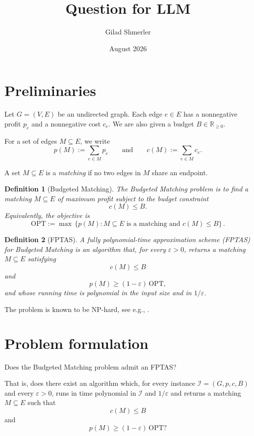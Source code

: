 \documentclass{article}
\title{Question for LLM}
\author{Gilad Shmerler}
\date{August 2026}
\newtheorem{definition}{Definition}[section]
\begin{document}
\maketitle

\section{Preliminaries}

Let $G=(V,E)$ be an undirected graph. Each edge $e\in E$ has a nonnegative profit $p_e$ and a nonnegative
cost $c_e$. We are also given a budget $B\in\mathbb{R}_{\geq 0}$.

For a set of edges $M\subseteq E$, we write
\[
    p(M):=\sum_{e\in M}p_e
    \qquad\text{and}\qquad
    c(M):=\sum_{e\in M}c_e.
\]

A set $M\subseteq E$ is a \emph{matching} if no two edges in $M$ share an endpoint.

\begin{definition}[Budgeted Matching]
The \emph{Budgeted Matching} problem is to find a matching $M\subseteq E$ of maximum profit subject to the budget constraint
\[
    c(M)\leq B.
\]
Equivalently, the objective is
\[
    \mathrm{OPT}:=\max\,\{p(M):M\subseteq E\text{ is a matching and }c(M)\leq B\}\,.
\]
\end{definition}

\begin{definition}[FPTAS]
A \emph{fully polynomial-time approximation scheme (FPTAS)} for Budgeted Matching is an algorithm that, for every
$\varepsilon>0$, returns a matching $M\subseteq E$ satisfying
\[
    c(M)\leq B
\]
and
\[
    p(M)\geq(1-\varepsilon)\,\mathrm{OPT},
\]
and whose running time is polynomial in the input size and in $1/\varepsilon$.
\end{definition}

The problem is known to be NP-hard, see e.g., \cite{doron-arad-shachnai-shmerler-talgam-cohen,doron-arad-kulik-shachnai}.

\section{Problem formulation}

Does the Budgeted Matching problem admit an FPTAS?

That is, does there exist an algorithm which, for every instance $\mathcal{I}=(G,p,c,B)$ and every $\varepsilon>0$, runs in
time polynomial in $\mathcal{I}$ and $1/\varepsilon$ and returns a matching $M\subseteq E$ such that
\[
    c(M)\leq B
\]
and
\[
    p(M)\geq(1-\varepsilon)\,\mathrm{OPT}?
\]
\end{document}
